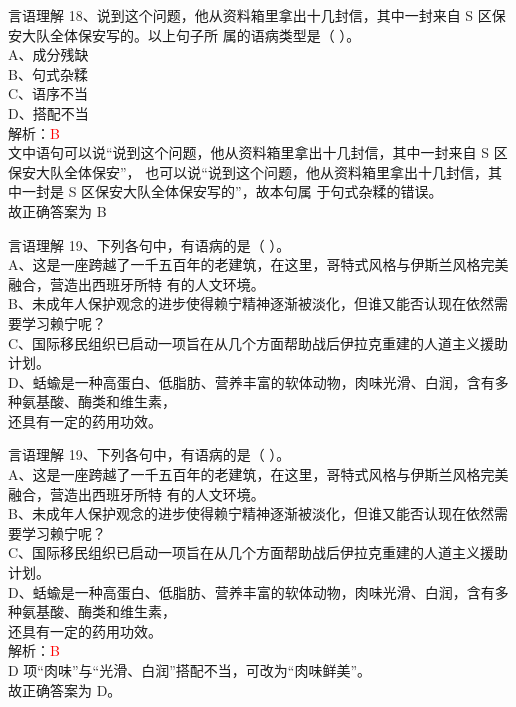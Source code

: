 \documentclass[aspectratio=169]{beamer}
\begin{document}
\begin{frame}[t]{言语理解}
18、说到这个问题，他从资料箱里拿出十几封信，其中一封来自 S 区保安大队全体保安写的。以上句子所
属的语病类型是（ ）。\\
A、成分残缺\\
B、句式杂糅\\
C、语序不当\\
D、搭配不当 \\
    解析：\textcolor{red}{B}\\
    文中语句可以说“说到这个问题，他从资料箱里拿出十几封信，其中一封来自 S 区保安大队全体保安”，
也可以说“说到这个问题，他从资料箱里拿出十几封信，其中一封是 S 区保安大队全体保安写的”，故本句属
于句式杂糅的错误。\\
故正确答案为 B\\
\end{frame}




\begin{frame}[t]{言语理解}
19、下列各句中，有语病的是（ ）。\\
A、这是一座跨越了一千五百年的老建筑，在这里，哥特式风格与伊斯兰风格完美融合，营造出西班牙所特
有的人文环境。\\
B、未成年人保护观念的进步使得赖宁精神逐渐被淡化，但谁又能否认现在依然需要学习赖宁呢？\\
C、国际移民组织已启动一项旨在从几个方面帮助战后伊拉克重建的人道主义援助计划。\\
D、蛞蝓是一种高蛋白、低脂肪、营养丰富的软体动物，肉味光滑、白润，含有多种氨基酸、酶类和维生素，\\
还具有一定的药用功效。\\
\end{frame}


\begin{frame}[t]{言语理解}
19、下列各句中，有语病的是（ ）。\\
A、这是一座跨越了一千五百年的老建筑，在这里，哥特式风格与伊斯兰风格完美融合，营造出西班牙所特
有的人文环境。\\
B、未成年人保护观念的进步使得赖宁精神逐渐被淡化，但谁又能否认现在依然需要学习赖宁呢？\\
C、国际移民组织已启动一项旨在从几个方面帮助战后伊拉克重建的人道主义援助计划。\\
D、蛞蝓是一种高蛋白、低脂肪、营养丰富的软体动物，肉味光滑、白润，含有多种氨基酸、酶类和维生素，\\
还具有一定的药用功效。\\
    解析：\textcolor{red}{B}\\
    D 项“肉味”与“光滑、白润”搭配不当，可改为“肉味鲜美”。\\
故正确答案为 D。\\
\end{frame}
\end{document}

